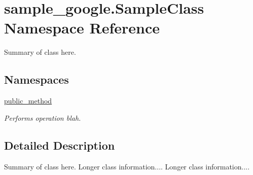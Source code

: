 \hypertarget{namespacesample__google_1_1_sample_class}{\section{sample\-\_\-google.\-Sample\-Class Namespace Reference}
\label{namespacesample__google_1_1_sample_class}
}


Summary of class here.  


\subsection*{Namespaces}
\begin{DoxyCompactItemize}
\item 
\hyperlink{namespacesample__google_1_1_sample_class_1_1public__method}{public\-\_\-method}
\begin{DoxyCompactList}\small\item\em Performs operation blah. \end{DoxyCompactList}\end{DoxyCompactItemize}


\subsection{Detailed Description}
Summary of class here. Longer class information.... Longer class information.... 